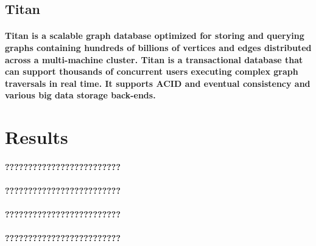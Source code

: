 \subsection{Titan}
\paragraph{Titan is a scalable graph database optimized for storing and querying graphs containing hundreds of billions of vertices and edges distributed across a multi-machine cluster. Titan is a transactional database that can support thousands of concurrent users executing complex graph traversals in real time. It supports ACID and eventual consistency and various big data storage back-ends.\cite{chang1997titan}}
\pagebreak
\section{Results}
\paragraph{?????????????????????????}
\paragraph{?????????????????????????}
\paragraph{?????????????????????????}
\paragraph{?????????????????????????}
\pagebreak



